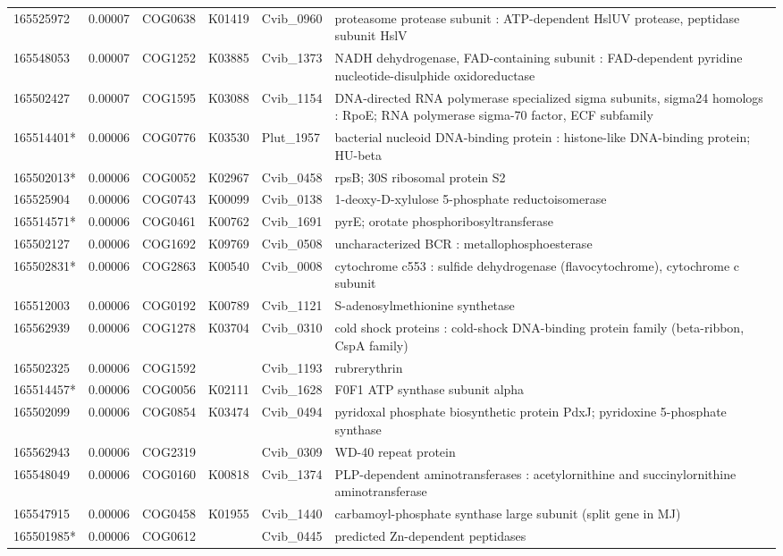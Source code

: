 \begin{landscape}
\begin{longtable}{p{1.8cm}p{0.9cm}p{2.2cm}p{1cm}p{2.8cm}p{13.4cm}}
165525972&0.00007&COG0638&K01419&Cvib\_0960&proteasome protease subunit : ATP-dependent HslUV protease, peptidase subunit HslV \\
165548053&0.00007&COG1252&K03885&Cvib\_1373&NADH dehydrogenase, FAD-containing subunit : FAD-dependent pyridine nucleotide-disulphide oxidoreductase \\
165502427&0.00007&COG1595&K03088&Cvib\_1154&DNA-directed RNA polymerase specialized sigma subunits, sigma24 homologs : RpoE; RNA polymerase sigma-70 factor, ECF subfamily \\
165514401*&0.00006&COG0776&K03530&Plut\_1957&bacterial nucleoid DNA-binding protein : histone-like DNA-binding protein; HU-beta \\
165502013*&0.00006&COG0052&K02967&Cvib\_0458&rpsB; 30S ribosomal protein S2 \\
165525904&0.00006&COG0743&K00099&Cvib\_0138&1-deoxy-D-xylulose 5-phosphate reductoisomerase \\
165514571*&0.00006&COG0461&K00762&Cvib\_1691&pyrE; orotate phosphoribosyltransferase \\
165502127&0.00006&COG1692&K09769&Cvib\_0508&uncharacterized BCR : metallophosphoesterase \\
165502831*&0.00006&COG2863&K00540&Cvib\_0008&cytochrome c553 : sulfide dehydrogenase (flavocytochrome), cytochrome c subunit \\
165512003&0.00006&COG0192&K00789&Cvib\_1121&S-adenosylmethionine synthetase \\
165562939&0.00006&COG1278&K03704&Cvib\_0310&cold shock proteins : cold-shock DNA-binding protein family (beta-ribbon, CspA family) \\
165502325&0.00006&COG1592&&Cvib\_1193&rubrerythrin \\
165514457*&0.00006&COG0056&K02111&Cvib\_1628&F0F1 ATP synthase subunit alpha \\
165502099&0.00006&COG0854&K03474&Cvib\_0494&pyridoxal phosphate biosynthetic protein PdxJ; pyridoxine 5-phosphate synthase \\
165562943&0.00006&COG2319&&Cvib\_0309&WD-40 repeat protein \\
165548049&0.00006&COG0160&K00818&Cvib\_1374&PLP-dependent aminotransferases : acetylornithine and succinylornithine aminotransferase \\
165547915&0.00006&COG0458&K01955&Cvib\_1440&carbamoyl-phosphate synthase large subunit (split gene in MJ) \\
165501985*&0.00006&COG0612&&Cvib\_0445&predicted Zn-dependent peptidases \\

\end{longtable}
\end{landscape}
